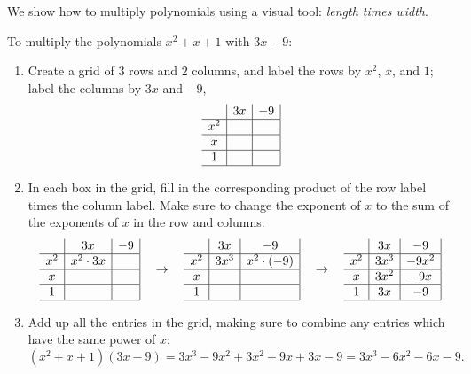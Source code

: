 \documentclass[12pt]{article}
\begin{document}
We show how to multiply polynomials using a visual tool: \emph{length times width}.  

To multiply the polynomials $x^2+x+1$ with $3x-9$:
\begin{enumerate}
\item Create a grid of $3$ rows and $2$ columns, and
label the rows by $x^2$, $x$, and $1$; label the columns by $3x$ and $-9$,
\begin{equation}
\begin{array}{c|c|c|}
 & 3x & -9 \\
\hline
x^2 & & \\
\hline 
x & & \\
\hline 
1 & & \\
\hline
\end{array}
\end{equation}
\item In each box in the grid, fill in the corresponding
product of the row label times the column label.  Make sure to
change the exponent of $x$ to the sum of the exponents of $x$
in the row and columns.
\begin{equation}
\begin{array}{c|c|c|}
 & 3x & -9 \\
\hline
x^2 & x^2\cdot 3x & \\
\hline 
x & & \\
\hline 
1 & & \\
\hline
\end{array}
\quad\rightarrow\quad
\begin{array}{c|c|c|}
 & 3x & -9 \\
\hline
x^2 & 3x^{3} & x^2\cdot (-9)\\
\hline 
x &  & \\
\hline 
1 &  &  \\
\hline
\end{array}
\quad\rightarrow\quad
\begin{array}{c|c|c|}
 & 3x & -9 \\
\hline
x^2 & 3x^{3} & -9x^2\\
\hline 
x & 3x^2 & -9x\\
\hline 
1 & 3x & -9 \\
\hline
\end{array}
\end{equation}
\item Add up all the entries in the grid, making sure to
combine any entries which have the same power of $x$:
\begin{equation}
(x^2+x+1)(3x-9)=3x^3-9x^2+3x^2-9x+3x-9=3x^3-6x^2-6x-9.
\end{equation}
\end{enumerate}
\end{document}
